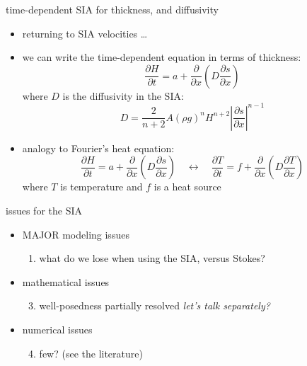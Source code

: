 \documentclass[10pt,dvipsnames]{beamer}
\newcommand{\comm}[1]{{\footnotesize \hfill \emph{#1}}}
\begin{document}
\begin{frame}{time-dependent SIA for thickness, and diffusivity}
\begin{itemize}
\item returning to SIA velocities \dots
\item we can write the time-dependent equation in terms of thickness:
$$\frac{\partial H}{\partial t} = a + \frac{\partial}{\partial x}\left(D \frac{\partial s}{\partial x}\right)$$
where $D$ is the \alert{diffusivity} in the SIA:
	$$D = \frac{2}{n+2} A (\rho g)^n H^{n+2} \left|\frac{\partial s}{\partial x}\right|^{n-1}$$
\item analogy to Fourier's heat equation:
$$\frac{\partial H}{\partial t} = a + \frac{\partial}{\partial x}\left(D \frac{\partial s}{\partial x}\right) \quad \leftrightarrow \quad \frac{\partial T}{\partial t} = f + \frac{\partial}{\partial x}\left(D \frac{\partial T}{\partial x}\right)$$
where $T$ is temperature and $f$ is a heat source
\end{itemize}
\end{frame}


\begin{frame}{issues for the SIA}
\begin{itemize}
\item[] \alert{MAJOR modeling issues}
    \begin{enumerate}
    \item what do we lose when using the SIA, versus Stokes?
    \end{enumerate}
\item[] \alert{mathematical issues}
    \begin{enumerate}\setcounter{enumi}{2}
    \item well-posedness partially resolved \comm{let's talk separately?}
    \end{enumerate}
\item[] \alert{numerical issues}
    \begin{enumerate}\setcounter{enumi}{3}
    \item few? (see the literature)
    \end{enumerate}
\end{itemize}
\end{frame}
\end{document}
